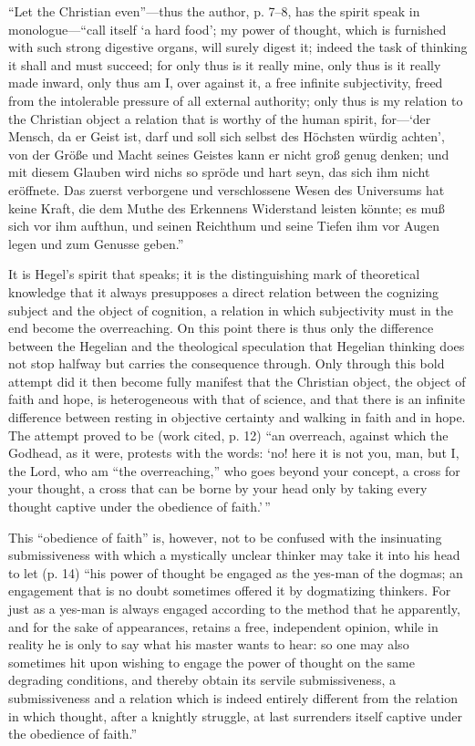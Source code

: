 \documentclass[12pt,a4paper,openany]{book}
\newcommand{\opage}[1]{\marginnote{\footnotesize\textit{[#1]}}}
\begin{document}
``Let the Christian even''---thus the author,
p. 7--8, has the spirit speak in monologue---``call itself `a
hard food'; my power of thought, which is furnished with such strong
digestive organs, will surely digest it; indeed the task of
thinking it shall and must succeed; for only thus is it
really mine, only thus is it really made inward,
only thus am I, over against it, a free infinite subjectivity,
freed from the intolerable pressure of all external authority;
only thus is my relation to the Christian object a
\setcounter{footnote}{0}%
\opage{16}relation that is worthy of the human spirit, for---`der
Mensch, da er Geist ist, darf und soll sich selbst des Höchsten
würdig achten', von der Größe und Macht seines Geistes
kann er nicht groß genug denken; und mit diesem Glauben
wird nichs so spröde und hart seyn, das sich ihm nicht eröffnete.
Das zuerst verborgene und verschlossene Wesen des
Universums hat keine Kraft, die dem Muthe des Erkennens
Widerstand leisten könnte; es muß sich vor ihm aufthun,
und seinen Reichthum und seine Tiefen ihm vor Augen legen
und zum Genusse geben.''

It is Hegel's spirit that speaks; it is the distinguishing mark of theoretical
knowledge that it always presupposes a direct
relation between the cognizing subject and the object of
cognition, a relation in which subjectivity must in the end become
the overreaching. On this point there is thus only the
difference between the Hegelian and the theological speculation
that Hegelian thinking does not stop halfway
but carries the consequence through. Only through this bold attempt
did it then become fully manifest that the Christian object,
the object of faith and hope, is heterogeneous with that of science,
and that there is an infinite difference between
resting in objective certainty and walking in faith and in hope.
The attempt proved to be (work cited, p. 12) ``an overreach, against
which the Godhead, as it were, protests with the words: `no!
here it is not you, man, but I, the Lord, who am ``the overreaching,''
who goes beyond your concept, a cross for your
thought, a cross that can be borne by your head only by
taking every thought captive under the obedience of faith.'\,''

This ``obedience of faith'' is, however, not to be confused %
with the insinuating submissiveness with which a mystically
\setcounter{footnote}{0}%
\opage{17}unclear thinker may take it into his head to let (p. 14) ``his power of thought
be engaged as the yes-man of the dogmas; an engagement
that is no doubt sometimes offered it by dogmatizing thinkers.
For just as a yes-man is always engaged according to the method
that he apparently, and for the sake of appearances, retains
a free, independent opinion, while in reality he is
only to say what his master wants to hear: so one may
also sometimes hit upon wishing to engage the power of thought
on the same degrading conditions, and thereby obtain
its servile submissiveness, a submissiveness and a relation
which is indeed entirely different from the relation
in which thought, after a knightly struggle, at last surrenders itself
captive under the obedience of faith.''
\end{document}
